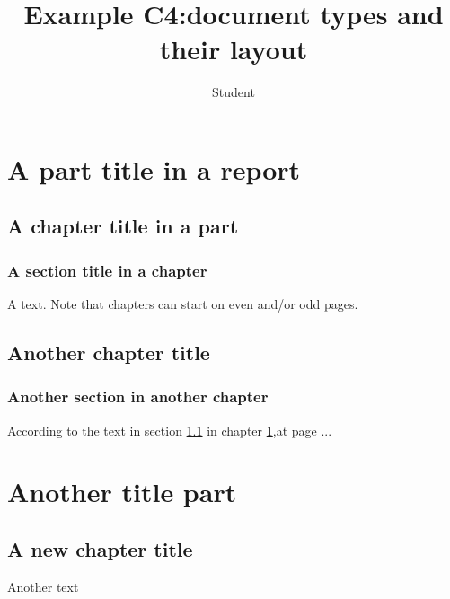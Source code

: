 \documentclass{report}
\title{Example C4:document types and their layout }
\author{Student}
\begin{document}
\maketitle
\tableofcontents
\part{A part title in a report}
\chapter{A chapter title in a part}\label{cha:et}
\section{A section title in a chapter}\label{sec:et}
A text. Note that chapters can start on even and/or odd pages.
\chapter{Another chapter title}
\section{Another section in another chapter}
According to the text in section \ref{sec:et} in chapter \ref{cha:et},at page \pageref{sec:et} ...
\part{Another title part}
\chapter{A new chapter title}
Another text
\end{document}

